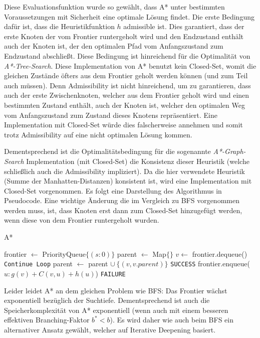 \documentclass{whswinvcbook}
\begin{document}
Diese Evaluationsfunktion wurde so gewählt, dass A* unter bestimmten Voraussetzungen mit Sicherheit eine optimale Lösung findet. Die erste Bedingung dafür ist, dass die Heuristikfunktion $h$ admissible ist.\cite{ai} Dies garantiert, dass der erste Knoten der vom Frontier runtergeholt wird und den Endzustand enthält auch der Knoten ist, der den optimalen Pfad vom Anfangszustand zum Endzustand abschließt. Diese Bedingung ist hinreichend für die Optimalität von \textit{A*-Tree-Search}. Diese Implementation von A* benutzt kein Closed-Set, womit die gleichen Zustände öfters aus dem Frontier geholt werden können (und zum Teil auch müssen). Denn Admissibility ist nicht hinreichend, um zu garantieren, dass auch der erste Zwischenknoten, welcher aus dem Frontier geholt wird und einen bestimmten Zustand enthält, auch der Knoten ist, welcher den optimalen Weg vom Anfangszustand zum Zustand dieses Knotens repräsentiert. Eine Implementation mit Closed-Set würde dies falscherweise annehmen und somit trotz Admissibility auf eine nicht optimalen Lösung kommen.

Dementsprechend ist die Optimalitätsbedingung für die sogenannte \textit{A*-Graph-Search} Implementation (mit Closed-Set) die Konsistenz dieser Heuristik (welche schließlich auch die Admissibility impliziert).\cite{ai} Da die hier verwendete Heuristik (Summe der Manhatten-Distanzen) konsistent ist, wird eine Implementation mit Closed-Set vorgenommen. Es folgt eine Darstellung des Algorithmus in Pseudocode. Eine wichtige Änderung die im Vergleich zu BFS vorgenommen werden muss, ist, dass Knoten erst dann zum Closed-Set hinzugefügt werden, wenn diese von dem Frontier runtergeholt wurden.
\begin{algorithm}[H]
    \caption{A*}\label{alg-astar}
    \begin{algorithmic}[1]
            \State frontier $\gets$ PriorityQueue$\{(s:0)\}$
            \State parent $\gets$ Map$\{\}$
            \Repeat
                \State $v\gets$ frontier.dequeue()
                    \State \texttt{Continue Loop}
                \EndIf
                \State parent $\gets$ parent $\cup\:\{(v,v.parent)\}$
                    \State \Return \texttt{SUCCESS}
                \EndIf
                    \State frontier.enqueue($u:g(v)+C(v,u)+h(u)$)
                \EndFor
            \State \Return \texttt{FAILURE}
        \EndFunction
    \end{algorithmic}
\end{algorithm}
Leider leidet A* an dem gleichen Problem wie BFS: Das Frontier wächst exponentiell bezüglich der Suchtiefe. Dementsprechend ist auch die Speicherkomplexität von A* exponentiell (wenn auch mit einem besseren effektiven Branching-Faktor $b^*<b$). Es wird daher wie auch beim BFS ein alternativer Ansatz gewählt, welcher auf Iterative Deepening basiert.
\end{document}
